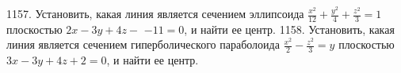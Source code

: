 1157. Установить, какая линия является сечением эллипсоида $\frac{x^2}{12}+\frac{y^2}{4}+\frac{z^2}{3}=1$ плоскостью $2 x-3 y+4 z-$ $-11=0$, и найти ее центр.
1158. Установить, какая линия является сечением гиперболического параболоида $\frac{x^2}{2}-\frac{z^2}{3}=y$ плоскостью $3 x-3 y+4 z+2=0$, и найти ее центр.